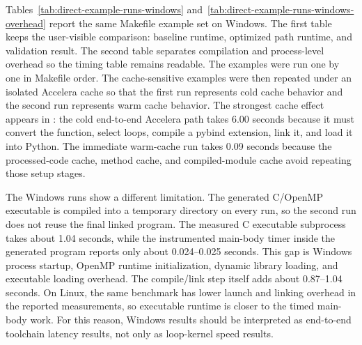 Tables~\ref{tab:direct-example-runs-windows}
and~\ref{tab:direct-example-runs-windows-overhead} report the same Makefile
example set on Windows. The first table keeps the user-visible comparison:
baseline runtime, optimized path runtime, and validation result. The second
table separates compilation and process-level overhead so the timing table
remains readable. The examples were run one by one in Makefile order. The
cache-sensitive examples were then repeated under an isolated Accelera cache so
that the first run represents cold cache behavior and the second run represents
warm cache behavior. The strongest cache effect appears in
: the cold end-to-end Accelera path takes
6.00 seconds because it must convert the function, select loops, compile a
pybind extension, link it, and load it into Python. The immediate warm-cache
run takes 0.09 seconds because the processed-code cache, method cache, and
compiled-module cache avoid repeating those setup stages.

The Windows  runs show a different
limitation. The generated C/OpenMP executable is compiled into a temporary
directory on every run, so the second run does not reuse the final linked
program. The measured C executable subprocess takes about 1.04 seconds, while
the instrumented main-body timer inside the generated program reports only
about 0.024--0.025 seconds. This gap is Windows process startup, OpenMP runtime
initialization, dynamic library loading, and executable loading overhead. The
compile/link step itself adds about 0.87--1.04 seconds. On Linux, the same
benchmark has lower launch and linking overhead in the reported measurements,
so executable runtime is closer to the timed main-body work. For this reason,
Windows results should be interpreted as end-to-end toolchain latency results,
not only as loop-kernel speed results.
